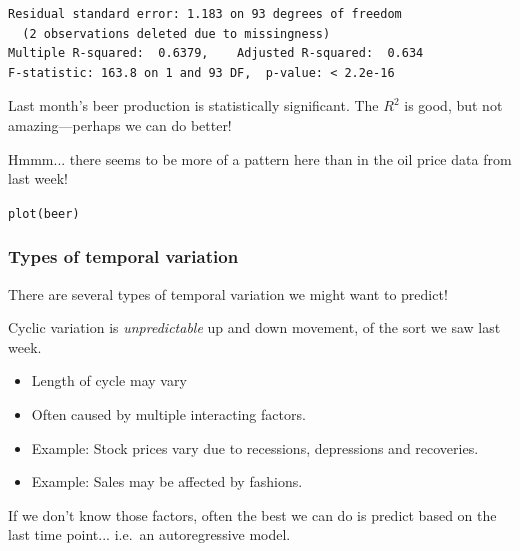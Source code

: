 \documentclass{beamer}\usepackage[]{graphicx}\usepackage[]{color}
\makeatletter
\newcommand{\hlstd}[1]{\textcolor[rgb]{1,0.894,0.769}{#1}}%
\newcommand{\hlkwd}[1]{\textcolor[rgb]{1,0.78,0.769}{#1}}%
\newenvironment{kframe}{%
 \def\at@end@of@kframe{}%
 \ifinner\ifhmode%
  \def\at@end@of@kframe{\end{minipage}}%
  \begin{minipage}{\columnwidth}%
 \fi\fi%
 \def\FrameCommand##1{\hskip\@totalleftmargin \hskip-\fboxsep
 \colorbox{shadecolor}{##1}\hskip-\fboxsep
     \hskip-\linewidth \hskip-\@totalleftmargin \hskip\columnwidth}%
 \MakeFramed {\advance\hsize-\width
   \@totalleftmargin\z@ \linewidth\hsize
   \@setminipage}}%
 {\par\unskip\endMakeFramed%
 \at@end@of@kframe}
\newenvironment{knitrout}{}{} %
\makeatother
\begin{document}
\begin{darkframes}
\begin{frame}[fragile]
\begin{knitrout}
\begin{kframe}
\begin{verbatim}
Residual standard error: 1.183 on 93 degrees of freedom
  (2 observations deleted due to missingness)
Multiple R-squared:  0.6379,	Adjusted R-squared:  0.634 
F-statistic: 163.8 on 1 and 93 DF,  p-value: < 2.2e-16
\end{verbatim}
\end{kframe}
\end{knitrout}
      \fontsize{10}{10}\selectfont
      Last month's beer production is statistically significant. The $R^2$ is good, but not amazing---perhaps we can do better!
\end{frame}

\begin{frame}[fragile]%
Hmmm... there seems to be more of a pattern here than in the oil price data from last week!
\begin{knitrout}
\begin{kframe}
\begin{alltt}
\hlkwd{plot}\hlstd{(beer)}
\end{alltt}
\end{kframe}


\end{knitrout}

\end{frame}
    \begin{frame}
\frametitle{Types of temporal variation}
There are several types of temporal variation we might want to predict!

\bigskip

\alert{Cyclic variation} is \emph{unpredictable} up and down movement, of the sort we saw last week.
\begin{itemize}
\item Length of cycle may vary
\item Often caused by multiple interacting factors.
\item Example: Stock prices vary due to recessions, depressions and recoveries.
\item Example: Sales may be affected by fashions.
\end{itemize}

\pause
If we don't know those factors, often the best we can do is predict based on the last time point... i.e.\ an autoregressive model.


\end{frame}
\end{darkframes}
\end{document}
